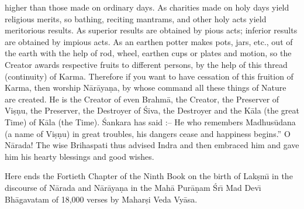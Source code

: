 higher than those made on ordinary days. As charities made on holy days yield religious merits, so bathing, reciting mantrams, and other holy acts yield meritorious results. As superior results are obtained by pious acts; inferior results are obtained by impious acts. As an earthen potter makes pots, jars, etc., out of the earth with the help of rod, wheel, earthen cups or plates and motion, so the Creator awards respective fruits to different persons, by the help of this thread (continuity) of Karma. Therefore if you want to have cessation of this fruition of Karma, then worship N\=ar\=aya\d{n}a, by whose command all these things of Nature are created. He is the Creator of even Brahm\=a, the Creator, the Preserver of Vi\d{s}\d{n}u, the Preserver, the Destroyer of \'Siva, the Destroyer and the K\=ala (the great Time) of K\=ala (the Time). \'Sankara has said :-- He who remembers Madhus\=udana (a name of Vi\d{s}\d{n}u) in great troubles, his dangers cease and happiness begins.'' O N\=arada! The wise Brihaspati thus advised Indra and then embraced him and gave him his hearty blessings and good wishes.

Here ends the Fortieth Chapter of the Ninth Book on the birth of Lak\d{s}m\={\i} in the discourse of N\=arada and N\=ar\=aya\d{n}a in the Mah\=a Pur\=a\d{n}am \'Sr\={\i} Mad Dev\={\i} Bh\=agavatam of 18,000 verses by Mahar\d{s}i Veda Vy\=asa.



